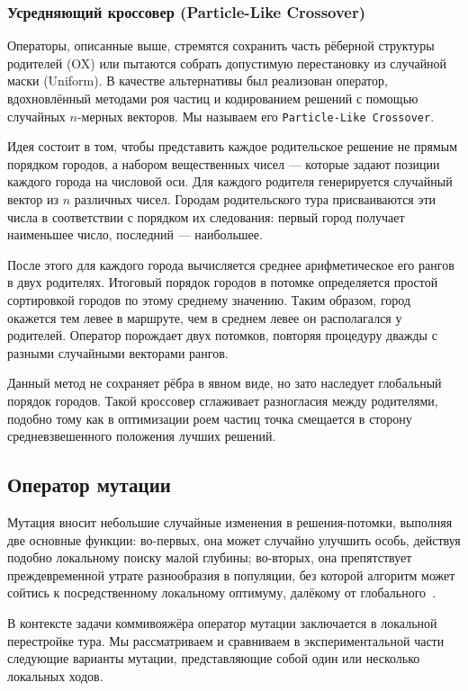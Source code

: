 \documentclass[a4paper,12pt]{article}
\begin{document}
\subsubsection{Усредняющий кроссовер (Particle-Like Crossover)}

Операторы, описанные выше, стремятся сохранить часть рёберной структуры родителей (OX) или пытаются собрать допустимую перестановку из случайной маски (Uniform). В качестве альтернативы был реализован оператор, вдохновлённый методами роя частиц и кодированием решений с помощью случайных $n$-мерных векторов. Мы называем его \texttt{Particle-Like Crossover}.

Идея состоит в том, чтобы представить каждое родительское решение не прямым порядком городов, а набором вещественных чисел — которые задают позиции каждого города на числовой оси. Для каждого родителя генерируется случайный вектор из $n$ различных чисел. Городам родительского тура присваиваются эти числа в соответствии с порядком их следования: первый город получает наименьшее число, последний — наибольшее.

После этого для каждого города вычисляется среднее арифметическое его рангов в двух родителях. Итоговый порядок городов в потомке определяется простой сортировкой городов по этому среднему значению. Таким образом, город окажется тем левее в маршруте, чем в среднем левее он располагался у родителей. Оператор порождает двух потомков, повторяя процедуру дважды с разными случайными векторами рангов.

Данный метод не сохраняет рёбра в явном виде, но зато наследует глобальный порядок городов. Такой кроссовер сглаживает разногласия между родителями, подобно тому как в оптимизации роем частиц точка смещается в сторону средневзвешенного положения лучших решений.

\subsection{Оператор мутации}

Мутация вносит небольшие случайные изменения в решения-потомки, выполняя две основные
функции: во-первых, она может случайно улучшить особь, действуя подобно локальному
поиску малой глубины; во-вторых, она препятствует преждевременной утрате разнообразия
в популяции, без которой алгоритм может сойтись к посредственному локальному оптимуму,
далёкому от глобального~\cite{gendreau2010handbook}.

В контексте задачи коммивояжёра оператор мутации заключается в локальной перестройке
тура. Мы рассматриваем и сравниваем в экспериментальной части следующие варианты
мутации, представляющие собой один или несколько локальных ходов.
\end{document}
